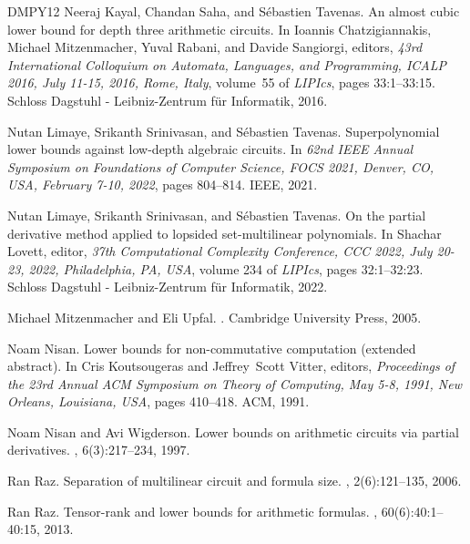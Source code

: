 \documentclass[10pt,a4paper]{article}
\theoremstyle{definition}%
\theoremstyle{plain}
\begin{document}
\begin{thebibliography}{DMPY12}
Neeraj Kayal, Chandan Saha, and S{\'{e}}bastien Tavenas.
\newblock An almost cubic lower bound for depth three arithmetic circuits.
\newblock In Ioannis Chatzigiannakis, Michael Mitzenmacher, Yuval Rabani, and
  Davide Sangiorgi, editors, {\em 43rd International Colloquium on Automata,
  Languages, and Programming, {ICALP} 2016, July 11-15, 2016, Rome, Italy},
  volume~55 of {\em LIPIcs}, pages 33:1--33:15. Schloss Dagstuhl -
  Leibniz-Zentrum f{\"{u}}r Informatik, 2016.

Nutan Limaye, Srikanth Srinivasan, and S{\'{e}}bastien Tavenas.
\newblock Superpolynomial lower bounds against low-depth algebraic circuits.
\newblock In {\em 62nd {IEEE} Annual Symposium on Foundations of Computer
  Science, {FOCS} 2021, Denver, CO, USA, February 7-10, 2022}, pages 804--814.
  {IEEE}, 2021.

Nutan Limaye, Srikanth Srinivasan, and S{\'{e}}bastien Tavenas.
\newblock On the partial derivative method applied to lopsided set-multilinear
  polynomials.
\newblock In Shachar Lovett, editor, {\em 37th Computational Complexity
  Conference, {CCC} 2022, July 20-23, 2022, Philadelphia, PA, {USA}}, volume
  234 of {\em LIPIcs}, pages 32:1--32:23. Schloss Dagstuhl - Leibniz-Zentrum
  f{\"{u}}r Informatik, 2022.

Michael Mitzenmacher and Eli Upfal.
.
\newblock Cambridge University Press, 2005.

Noam Nisan.
\newblock Lower bounds for non-commutative computation (extended abstract).
\newblock In Cris Koutsougeras and Jeffrey~Scott Vitter, editors, {\em
  Proceedings of the 23rd Annual {ACM} Symposium on Theory of Computing, May
  5-8, 1991, New Orleans, Louisiana, {USA}}, pages 410--418. {ACM}, 1991.

Noam Nisan and Avi Wigderson.
\newblock Lower bounds on arithmetic circuits via partial derivatives.
, 6(3):217--234, 1997.

Ran Raz.
\newblock Separation of multilinear circuit and formula size.
, 2(6):121--135, 2006.

Ran Raz.
\newblock Tensor-rank and lower bounds for arithmetic formulas.
, 60(6):40:1--40:15, 2013.


\end{thebibliography}
\end{document}

